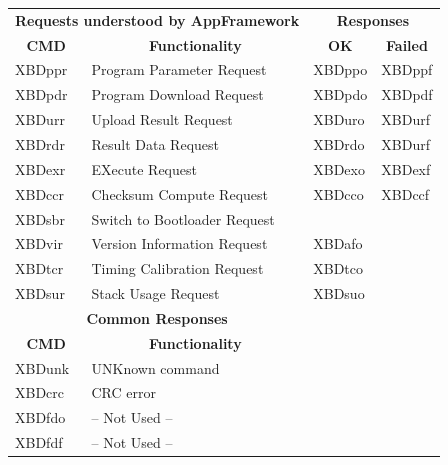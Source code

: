 \documentclass[twoside,11pt]{cergdoc}
\newcommand\thead[1]{\multicolumn{1}{c}{\textbf{#1}}}
\begin{document}
\begin{appendix}
\begin{longtable}{llll}
      \multicolumn{2}{c}{\textbf{Requests understood by AppFramework}} & \multicolumn{2}{c}{\textbf{Responses}}\\ 
      \thead{CMD} & \thead{Functionality}               & \thead{OK} & \thead{Failed} \\ \hline 
      XBDppr & Program Parameter Request                    & XBDppo & XBDppf \\
      XBDpdr & Program Download Request                     & XBDpdo & XBDpdf \\
      XBDurr & Upload Result Request                        & XBDuro & XBDurf \\
      XBDrdr & Result Data Request                          & XBDrdo & XBDurf \\
      XBDexr & EXecute Request                              & XBDexo & XBDexf \\
      XBDccr & Checksum Compute Request                     & XBDcco & XBDccf \\
      XBDsbr & Switch to Bootloader Request                 &        &        \\
      XBDvir & Version Information Request                  & XBDafo &        \\
      XBDtcr & Timing Calibration Request                   & XBDtco &        \\
      XBDsur & Stack Usage Request                          & XBDsuo &        \\ \hline
      
      \multicolumn{2}{c}{\textbf{Common Responses}}         &        &        \\ 
      \thead{CMD} & \thead{Functionality}                   &        &        \\ \hline 
      XBDunk & UNKnown command                              &        &        \\ 
      XBDcrc & CRC error                                    &        &        \\
      XBDfdo & -- Not Used --                               &        &        \\
      XBDfdf & -- Not Used --                               &        &        \\ \hline
      
  \end{longtable}

\end{appendix}
\end{document}
